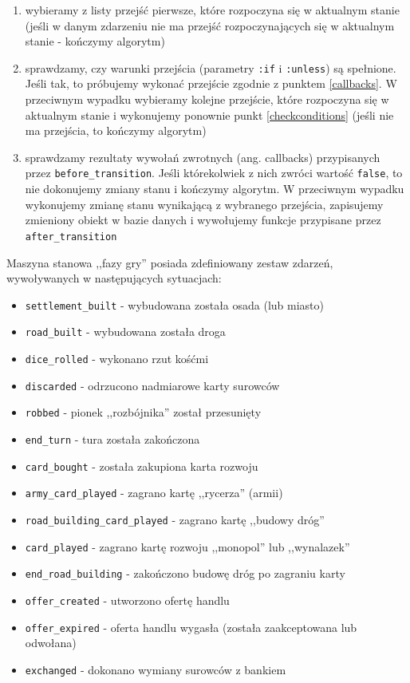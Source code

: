 \documentclass[a4paper,12pt]{article}
\begin{document}
\begin{enumerate}
\item wybieramy z listy przejść pierwsze, które rozpoczyna się w
  aktualnym stanie (jeśli w danym zdarzeniu nie ma przejść
  rozpoczynających się w aktualnym stanie - kończymy
  algorytm) \label{selectfirst}
\item sprawdzamy, czy warunki przejścia (parametry \texttt{:if} i
  \texttt{:unless}) są spełnione\label{checkconditions}. Jeśli tak, to
  próbujemy wykonać przejście zgodnie z punktem \ref{callbacks}. W
  przeciwnym wypadku wybieramy kolejne przejście, które rozpoczyna się
  w aktualnym stanie i wykonujemy ponownie punkt \ref{checkconditions}
  (jeśli nie ma przejścia, to kończymy algorytm)
\item sprawdzamy rezultaty wywołań zwrotnych (ang. callbacks)
  przypisanych przez \texttt{before\_transition}. Jeśli którekolwiek z
  nich zwróci wartość \texttt{false}, to nie dokonujemy zmiany stanu i
  kończymy algorytm. W przeciwnym wypadku wykonujemy zmianę stanu
  wynikającą z wybranego przejścia, zapisujemy zmieniony obiekt w
  bazie danych i wywołujemy funkcje przypisane przez
  \texttt{after\_transition} \label{callbacks}
\end{enumerate}

Maszyna stanowa ,,fazy gry'' posiada zdefiniowany zestaw zdarzeń,
wywoływanych w następujących sytuacjach:

\begin{itemize}
\item \texttt{settlement\_built} - wybudowana została osada (lub miasto)
\item \texttt{road\_built} - wybudowana została droga
\item \texttt{dice\_rolled} - wykonano rzut kośćmi
\item \texttt{discarded} - odrzucono nadmiarowe karty surowców
\item \texttt{robbed} - pionek ,,rozbójnika'' został przesunięty
\item \texttt{end\_turn} - tura została zakończona
\item \texttt{card\_bought} - została zakupiona karta rozwoju
\item \texttt{army\_card\_played} - zagrano kartę ,,rycerza'' (armii)
\item \texttt{road\_building\_card\_played} - zagrano kartę ,,budowy
  dróg''
\item \texttt{card\_played} - zagrano kartę rozwoju ,,monopol'' lub
  ,,wynalazek''
\item \texttt{end\_road\_building} - zakończono budowę dróg po
  zagraniu karty
\item \texttt{offer\_created} - utworzono ofertę handlu
\item \texttt{offer\_expired} - oferta handlu wygasła (została
  zaakceptowana lub odwołana)
\item \texttt{exchanged} - dokonano wymiany surowców z bankiem
\end{itemize}
\end{document}
